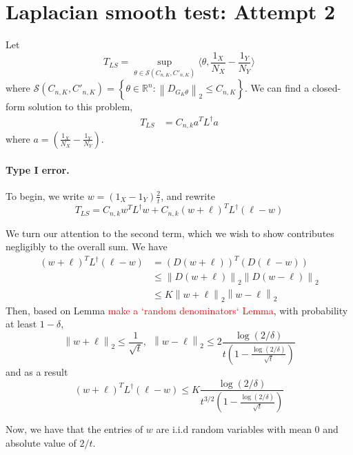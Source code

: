 \documentclass{article}
\newcommand{\Reals}{\mathbb{R}}
\newcommand{\norm}[1]{\left\lVert#1\right\rVert}
\newcommand{\set}[1]{\left\{#1\right\}}
\newcommand{\dotp}[2]{\langle #1, #2 \rangle}
\newcommand{\1}{\mathbb{I}}
\newcommand{\Linv}{L^{\dagger}}
\theoremstyle{alden}
\theoremstyle{aldenthm}
\theoremstyle{definition}
\theoremstyle{remark}
\begin{document}
\section{Laplacian smooth test: Attempt 2}
Let
\begin{equation*}
T_{LS} = \sup_{\theta \in \mathcal{S}(C_{n,K}, C'_{n,K})} \dotp{\theta}{\frac{1_X}{N_X} - \frac{1_Y}{N_Y}}
\end{equation*}
where $\mathcal{S}(C_{n,K}, C'_{n,K}) = \set{\theta \in \Reals^n: \norm{D_{G_K\theta}}_2 \leq C_{n,K}}$. We can find a closed-form solution to this problem,
\begin{align*}
T_{LS} & = C_{n,k} a^T \Linv a
\end{align*}
where $a = (\frac{1_X}{N_X} - \frac{1_Y}{N_Y})$. 

\paragraph{Type I error.}

To begin, we write $w = (1_X - 1_Y)\frac{2}{t}$, and rewrite
\begin{equation*}
T_{LS} = C_{n,k} w^T \Linv w + C_{n,k} (w + \ell)^T \Linv (\ell - w)
\end{equation*}

We turn our attention to the second term, which we wish to show contributes negligibly to the overall sum. We have
\begin{align*}
(w + \ell)^T \Linv (\ell - w) & = (D(w + \ell))^T (D(\ell - w)) \\
& \leq \norm{D(w + \ell)}_2 \norm{D(w - \ell)}_2 \\
& \leq K \norm{w + \ell}_2 \norm{w - \ell}_2
\end{align*}
Then, based on Lemma \textcolor{red}{make a `random denominators` Lemma}, with probability at least $1 - \delta$,
\begin{equation*}
\norm{w + \ell}_2 \leq \frac{1}{\sqrt{t}}, ~~ \norm{w - \ell}_2 \leq 2 \frac{\log(2/\delta)}{t \left(1 - \frac{\log(2/\delta)}{\sqrt{t}}\right)}
\end{equation*}
and as a result
\begin{equation*}
(w + \ell)^T \Linv (\ell - w) \leq K \frac{\log(2/\delta)}{t^{3/2} \left(1 - \frac{\log(2/\delta)}{\sqrt{t}}\right)}
\end{equation*}

Now, we have that the entries of $w$ are i.i.d random variables with mean $0$ and absolute value of $2/t$.
\end{document}
